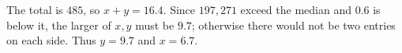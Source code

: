 The total is $485$, so $x+y=16.4$. Since $197,271$ exceed the median and $0.6$ is below it, the larger of $x,y$ must be $9.7$; otherwise there would not be two entries on each side. Thus $y=9.7$ and $\boxed{x=6.7}$.
